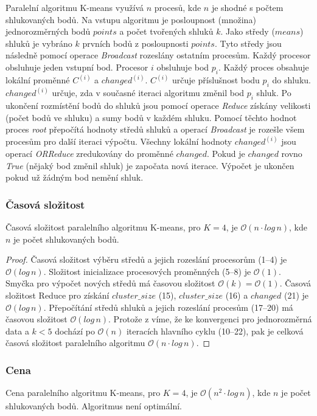 \documentclass[a4paper, 11pt, fleqn]{scrartcl}
\begin{document}
      Paralelní algoritmu K-means využívá $n$ procesů, kde $n$ je shodné s počtem shlukovaných bodů. Na vstupu algoritmu je posloupnost (množina) jednorozměrných bodů $points$ a počet tvořených shluků $k$. Jako středy ($means$) shluků je vybráno $k$ prvních bodů z posloupnosti $points$. Tyto středy jsou následně pomocí operace \textit{Broadcast} rozeslány ostatním procesům. Každý procesor obsluhuje jeden vstupní bod. Procesor $i$ obsluhuje bod $p_i$. Každý proces obsahuje lokální proměnné $C^{(i)}$ a $changed^{(i)}$. $C^{(i)}$ určuje příslušnost bodu $p_i$ do shluku. $changed^{(i)}$ určuje, zda v současné iteraci algoritmu změnil bod $p_i$ shluk. Po ukončení rozmístění bodů do shluků jsou pomocí operace \textit{Reduce} získány velikosti (počet bodů ve shluku) a sumy bodů v každém shluku. Pomocí těchto hodnot proces \textit{root} přepočítá hodnoty středů shluků a operací \textit{Broadcast} je rozešle všem procesům pro další iteraci výpočtu. Všechny lokální hodnoty $changed^{(i)}$ jsou operací \textit{ORReduce} zredukovány do proměnné $changed$. Pokud je $changed$ rovno \textit{True} (nějaký bod změnil shluk) je započata nová iterace. Výpočet  je ukončen pokud už žádným bod nemění shluk.

      \subsubsection{Časová složitost}
        Časová složitost paralelního algoritmu K-means, pro $K = 4$, je $\mathcal{O}(n\cdot log\, n)$, kde $n$ je počet shlukovaných bodů.

        \begin{proof}
          Časová složitost výběru středů a jejich rozeslání procesorům (1--4) je $\mathcal{O}(log\, n)$. Složitost inicializace procesových proměnných (5--8) je $\mathcal{O}(1)$. Smyčka pro výpočet nových středů má časovou složitost $\mathcal{O}(k) = \mathcal{O}(1)$. Časová složitost Reduce pro získání $cluster\_size$ (15), $cluster\_size$ (16) a $changed$ (21) je $\mathcal{O}(log\, n)$. Přepočítání středů shluků a jejich rozeslání procesům (17--20) má časovou složitost $\mathcal{O}(log\, n)$. Protože z \cite{fast} víme, že ke konvergenci pro jednorozměrná data a $k < 5$ dochází po $\mathcal{O}(n)$ iteracích hlavního cyklu (10--22), pak je celková časová složitost paralelního algoritmu $\mathcal{O}(n\cdot log\, n)$.
        \end{proof}


      \subsubsection{Cena}
        Cena paralelního algoritmu K-means, pro $K = 4$, je $\mathcal{O}(n^2\cdot log\, n)$, kde $n$ je počet shlukovaných bodů. Algoritmus není optimální.
\end{document}
